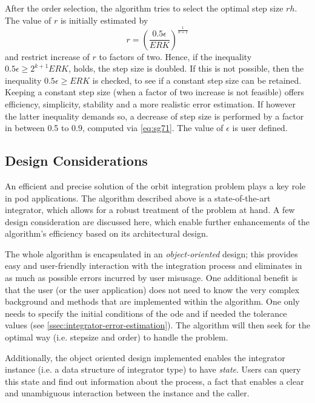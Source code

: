 After the order selection, the algorithm tries to select the optimal step size $rh$. 
The value of $r$ is initially estimated by
\begin{equation}\label{eq:sg71}
  r = \left( \frac{0.5 \epsilon}{ERK} \right) ^{\frac{1}{k+1}}
\end{equation}
and restrict increase of $r$ to factors of two. Hence, if the inequality 
$0.5 \epsilon \ge 2^{k+1}ERK$, holds, the step size is doubled. If this is not 
possible, then the inequality $0.5 \epsilon \ge ERK$ is checked, to see if a constant 
step size can be retained. Keeping a constant step size (when a factor of two 
increase is not feasible) offers efficiency, simplicity, stability and a more 
realistic error estimation. If however the latter inequality demands so, a decrease 
of step size is performed by a factor in between 0.5 to 0.9, computed via \autoref{eq:sg71}.
The value of $\epsilon$ is user defined.

\subsection{Design Considerations}\label{ssec:design-considerations}
An efficient and precise solution of the orbit integration problem plays a key 
role in \gls{pod} applications. The algorithm described above is a state-of-the-art 
integrator, which allows for a robust treatment of the problem at hand. 
A few design consideration are discussed here, which enable further enhancements 
of the algorithm's efficiency based on its architectural design.

The whole algorithm is encapsulated in an \emph{object-oriented} design; this provides easy and 
user-friendly interaction with the integration process and eliminates in as much as 
possible errors incurred by user misusage. One additional benefit is that the 
user (or the user application) does not need to know the very complex background and 
methods that are implemented within the algorithm. One only needs to specify the 
initial conditions of the \gls{ode} and if needed the tolerance values (see 
\autoref{ssec:integrator-error-estimation}). The algorithm will then seek for the 
optimal way (i.e. stepsize and order) to handle the problem.

Additionally, the object oriented design implemented enables the integrator instance (i.e. 
a data structure of integrator type) to have \emph{state}. Users can query this state 
and find out information about the process, a fact that enables a clear and unambiguous 
interaction between the instance and the caller.

